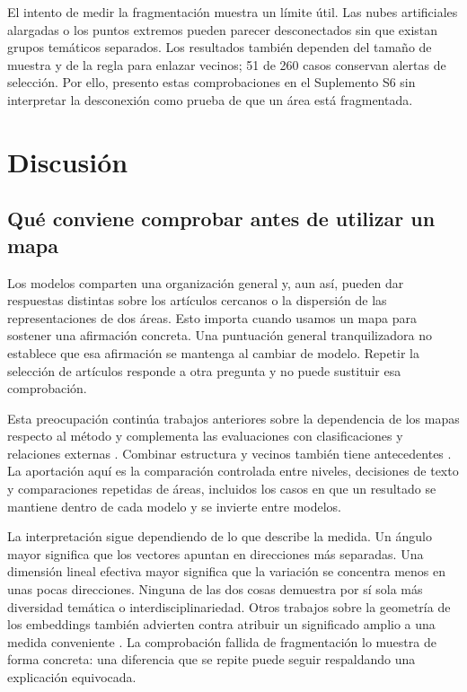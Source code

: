 \documentclass[12pt]{article}
\begin{document}
El intento de medir la fragmentación muestra un límite útil. Las nubes artificiales alargadas o los puntos extremos pueden parecer desconectados sin que existan grupos temáticos separados. Los resultados también dependen del tamaño de muestra y de la regla para enlazar vecinos; 51 de 260 casos conservan alertas de selección. Por ello, presento estas comprobaciones en el Suplemento S6 sin interpretar la desconexión como prueba de que un área está fragmentada.

\FloatBarrier
\section{Discusión}
\subsection{Qué conviene comprobar antes de utilizar un mapa}
Los modelos comparten una organización general y, aun así, pueden dar respuestas distintas sobre los artículos cercanos o la dispersión de las representaciones de dos áreas. Esto importa cuando usamos un mapa para sostener una afirmación concreta. Una puntuación general tranquilizadora no establece que esa afirmación se mantenga al cambiar de modelo. Repetir la selección de artículos responde a otra pregunta y no puede sustituir esa comprobación.

Esta preocupación continúa trabajos anteriores sobre la dependencia de los mapas respecto al método \citep{refa0d2d707e6,ref6a2f5912bc} y complementa las evaluaciones con clasificaciones y relaciones externas \citep{refbe130e2973,refc0e2cc29e0}. Combinar estructura y vecinos también tiene antecedentes \citep{ref4e1e0d5582}. La aportación aquí es la comparación controlada entre niveles, decisiones de texto y comparaciones repetidas de áreas, incluidos los casos en que un resultado se mantiene dentro de cada modelo y se invierte entre modelos.

La interpretación sigue dependiendo de lo que describe la medida. Un ángulo mayor significa que los vectores apuntan en direcciones más separadas. Una dimensión lineal efectiva mayor significa que la variación se concentra menos en unas pocas direcciones. Ninguna de las dos cosas demuestra por sí sola más diversidad temática o interdisciplinariedad. Otros trabajos sobre la geometría de los embeddings también advierten contra atribuir un significado amplio a una medida conveniente \citep{rudman-etal-2022-isoscore}. La comprobación fallida de fragmentación lo muestra de forma concreta: una diferencia que se repite puede seguir respaldando una explicación equivocada.
\end{document}
